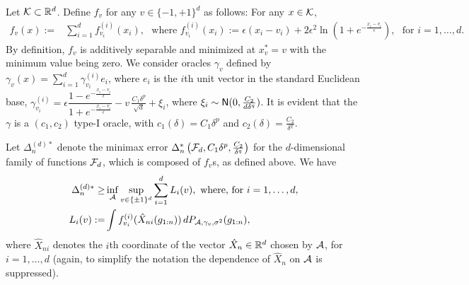 Let $\mathcal{K} \subset \mathbb{R}^d$.
Define $f_v$ for any $v\in \{-1,+1\}^d$ as follows: For any $x \in \mathcal{K}$, 
\begin{align*}
  f_v(x) :=& \sum_{i=1}^d f^{(i)}_{v_i}(x_i), \,\,  \text{ where }
  f^{(i)}_{v_i}(x_i) := \epsilon\left( x_i-v_i\right)+2\epsilon^2 \ln\left(1+e^{-\frac{x_i-v_i}{\epsilon}}  \right),  \,\, \text{ for } i=1,\ldots,d.
\end{align*}
By definition, $f_v$ is additively separable and minimized at $x^*_v=v$ with the minimum value being zero.
We consider oracles $\gamma_v$ defined by
$\gamma_v(x) = \sum_{i=1}^d \gamma_{v_i}^{(i)}e_i$, where 
$e_i$ is the $i$th unit vector in the standard Euclidean base,
$\gamma_{v_i}^{(i)} = 
\epsilon \dfrac{1-e^{-\frac{x_i-v_i}{\epsilon}}}{1+e^{-\frac{x_i-v_i}{\epsilon}}} - v\, \frac{C_1 \delta^p}{\sqrt{d}}  + \xi_i
$, where $\xi_i \sim \mathsf{N}(0,\frac{C_2}{d\delta^q})$. 
It is evident that the $\gamma$ is a $(c_1,c_2)$ type-I oracle, with $c_1(\delta)=C_1\delta^p$ and $c_2(\delta)=\frac{C_2}{\delta^q}$.

Let $\Delta_n^{(d)*}$ denote the minimax error $\Delta_n^*\left(\mathcal{F}_d, C_1\delta^p,\frac{C_2}{\delta^q}\right)$ for the $d$-dimensional family of functions $\mathcal{F}_d$, which is composed of $f_v$s, as defined above. We have
\begin{align*}
 \Delta_n^{(d)*} \ge& \inf_{\mathcal{A}}  \sup_{v\in \{\pm 1 \}^d}\sum_{i=1}^d L_i(v), \text{ where, for } i=1,\ldots,d,\\
 L_i(v) := & \int f^{(i)}_{v_i}(\hat X_{ni}(g_{1:n}) )\, dP_{\mathcal{A},\gamma_v,\sigma^2}(g_{1:n}),  
\end{align*}
where $\hat{X}_{ni}$ denotes the $i$th coordinate of the vector $\hat{X}_n \in \mathbb{R}^d$ chosen by $\mathcal{A}$, for $i=1,\ldots,d$
(again, to simplify the notation the dependence of $\hat{X}_n$ on $\mathcal{A}$ is suppressed).



